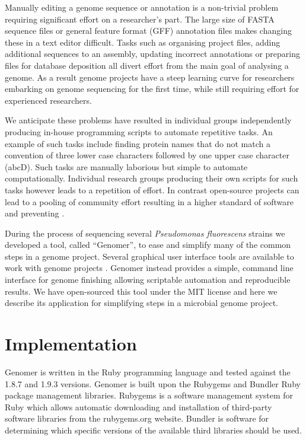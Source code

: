 \documentclass[10pt]{article}
\begin{document}
Manually editing a genome sequence or annotation is a non-trivial problem
requiring significant effort on a researcher's part. The large size of FASTA
sequence files or general feature format (GFF) annotation files makes changing
these in a text editor difficult. Tasks such as organising project files,
adding additional sequences to an assembly, updating incorrect annotations or
preparing files for database deposition all divert effort from the main goal of
analysing a genome. As a result genome projects have a steep learning curve for
researchers embarking on genome sequencing for the first time, while still
requiring effort for experienced researchers.

We anticipate these problems have resulted in individual groups independently
producing in-house programming scripts to automate repetitive tasks. An example
of such tasks include finding protein names that do not match a convention of
three lower case characters followed by one upper case character (abcD). Such
tasks are manually laborious but simple to automate computationally. Individual
research groups producing their own scripts for such tasks however leads to a
repetition of effort. In contrast open-source projects can lead to a pooling of
community effort resulting in a higher standard of software and preventing
\cite{ince2012}.

During the process of sequencing several \emph{Pseudomonas fluorescens} strains
we developed a tool, called ``Genomer'', to ease and simplify many of the
common steps in a genome project. Several graphical user interface tools are
available to work with genome projects \cite{tanaka2006, wilkinson2002,
lopez2011, carver2012, gordon2003}. Genomer instead provides a simple, command
line interface for genome finishing allowing scriptable automation and
reproducible results. We have open-sourced this tool under the MIT license and
here we describe its application for simplifying steps in a microbial genome
project.

\section*{Implementation}

Genomer is written in the Ruby programming language \cite{ruby-lang,goto2010}
and tested against the 1.8.7 and 1.9.3 versions. Genomer is built upon the
Rubygems and Bundler Ruby package management libraries. Rubygems is a software
management system for Ruby which allows automatic downloading and installation
of third-party software libraries from the rubygems.org website. Bundler is
software for determining which specific versions of the available third
libraries should be used.
\end{document}
